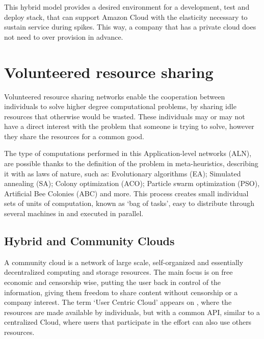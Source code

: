 This hybrid model provides a desired environment for a development, test and deploy stack, that can support Amazon Cloud with the elasticity necessary to sustain service during spikes. This way, a company that has a private cloud does not need to over provision in advance.

% 
% 
\section{Volunteered resource sharing}

Volunteered resource sharing networks enable the cooperation between individuals to solve higher degree computational problems, by sharing idle resources that otherwise would be wasted. These individuals may or may not have a direct interest with the problem that someone is trying to solve, however they share the resources for a common good. 

The type of computations performed in this Application-level networks (ALN), are possible thanks to the definition of the problem in meta-heuristics, describing it with as laws of nature\cite{Duda2013}, such as: Evolutionary algorithms (EA); Simulated annealing (SA); Colony optimization (ACO); Particle swarm optimization (PSO), Artificial Bee Colonies (ABC) and more. This process creates small individual sets of units of computation, known as `bag of tasks', easy to distribute through several machines in and executed in parallel.
                  

\subsection{Hybrid and Community Clouds}

A community cloud is a network of large scale, self-organized and essentially decentralized computing and storage resources. The main focus is on free economic and censorship wise, putting the user back in control of the information, giving them freedom to share content without censorship or a company interest. The term `User Centric Cloud' appears on \cite{Barraca2011}, where the resources are made available by individuals, but with a common API, similar to a centralized Cloud, where users that participate in the effort can also use others resources.

